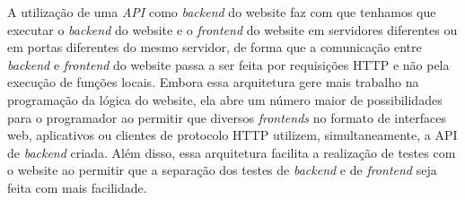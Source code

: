 A utilização de uma \textit{API} como \textit{backend} do website faz com que tenhamos que executar o \textit{backend} do website e o \textit{frontend} do website em servidores diferentes ou em portas diferentes do mesmo servidor, de forma que a comunicação entre \textit{backend} e \textit{frontend} do website passa a ser feita por requisições HTTP e não pela execução de funções locais. Embora essa arquitetura gere mais trabalho na programação da lógica do website, ela abre um número maior de possibilidades para o programador ao permitir que diversos \textit{frontends} no formato de interfaces web, aplicativos ou clientes de protocolo HTTP utilizem, simultaneamente, a API de \textit{backend} criada. Além disso, essa arquitetura facilita a realização de testes com o website ao permitir que a separação dos testes de \textit{backend} e de \textit{frontend} seja feita com mais facilidade.
